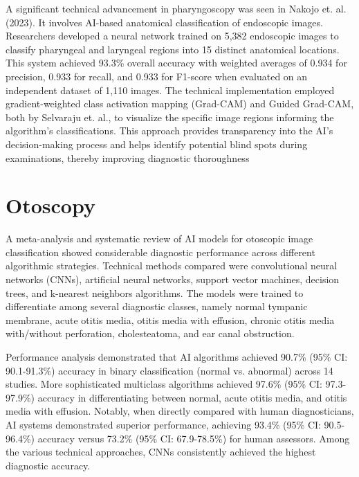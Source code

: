A significant technical advancement in pharyngoscopy was seen in Nakojo et. al. (2023). It involves AI-based anatomical classification of endoscopic images. Researchers developed a neural network trained on 5,382 endoscopic images to classify pharyngeal and laryngeal regions into 15 distinct anatomical locations. This system achieved 93.3\% overall accuracy with weighted averages of 0.934 for precision, 0.933 for recall, and 0.933 for F1-score when evaluated on an independent dataset of 1,110 images. The technical implementation employed gradient-weighted class activation mapping (Grad-CAM) \cite{selva} and Guided Grad-CAM, both by Selvaraju et. al., to visualize the specific image regions informing the algorithm's classifications. This approach provides transparency into the AI's decision-making process and helps identify potential blind spots during examinations, thereby improving diagnostic thoroughness~\cite{nakajo} \par

\section{Otoscopy}

A meta-analysis and systematic review of AI models for otoscopic image classification showed considerable diagnostic performance across different algorithmic strategies. Technical methods compared were convolutional neural networks (CNNs), artificial neural networks, support vector machines, decision trees, and k-nearest neighbors algorithms. The models were trained to differentiate among several diagnostic classes, namely normal tympanic membrane, acute otitis media, otitis media with effusion, chronic otitis media with/without perforation, cholesteatoma, and ear canal obstruction.~\cite{habibi}

Performance analysis demonstrated that AI algorithms achieved 90.7\% (95\% CI: 90.1-91.3\%) accuracy in binary classification (normal vs. abnormal) across 14 studies. More sophisticated multiclass algorithms achieved 97.6\% (95\% CI: 97.3-97.9\%) accuracy in differentiating between normal, acute otitis media, and otitis media with effusion. Notably, when directly compared with human diagnosticians, AI systems demonstrated superior performance, achieving 93.4\% (95\% CI: 90.5-96.4\%) accuracy versus 73.2\% (95\% CI: 67.9-78.5\%) for human assessors. Among the various technical approaches, CNNs consistently achieved the highest diagnostic accuracy. \cite{habibi}